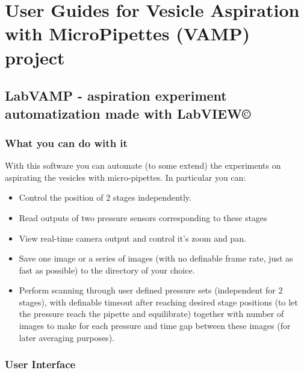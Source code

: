 
\chapter{User Guides for Vesicle Aspiration with MicroPipettes (VAMP) project}\label{chap:userguide}

\section{LabVAMP - aspiration experiment automatization made with LabVIEW\copyright{}}\label{labvamp}

\subsection{What you can do with it}\label{labvamp-features}

With this software you can automate (to some extend) the experiments on aspirating the vesicles with micro-pipettes. In particular you can:
\begin{itemize}
	\item Control the position of 2 stages independently.
	\item Read outputs of two pressure sensors corresponding to these stages
	\item View real-time camera output and control it's zoom and pan.
	\item Save one image or a series of images (with no definable frame rate, just as fast as possible) to the directory of your choice.
	\item Perform scanning through user defined pressure sets (independent for 2 stages), with definable timeout after reaching desired stage positions (to let the pressure reach the pipette and equilibrate) together with number of images to make for each pressure and time gap between these images (for later averaging purposes).
\end{itemize}

\subsection{User Interface}\label{labvamp-ui}

